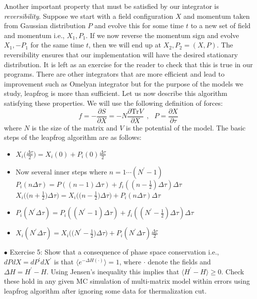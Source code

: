 \documentclass[letter,11pt]{article}
\begin{document}
Another important property that must be satisfied by our integrator is \emph{reversibility}. Suppose we start with a field configuration $X$ and momentum taken from Gaussian distribution $P$ and evolve this for some time $t$ to a new set of field and momentum i.e., $X_{1},P_{1}$. If we now reverse the momentum sign and evolve 
$X_{1},-P_{1} $ for the same time $t$, then we will end up at $X_{2},P_{2} = (X,P)$. The reversibility ensures that our implementation will have the desired stationary distribution. It is left as an exercise for the reader to check that this is true in our programs. There are other integrators that are more efficient and lead to improvement such as Omelyan integrator but for the purpose of the models we study, leapfrog is more than sufficient. Let us now describe this algorithm satisfying these properties. We will use the following definition of forces:
\begin{equation}
	f = -\frac{\partial S}{\partial X} = -N\frac{\partial \mbox{Tr} V}{\partial X} ~~,~~~ P = \frac{\partial X}{\partial \tau}
\end{equation} 
where $N$ is the size of the matrix and $V$ is the potential of the model. The basic steps of the leapfrog algorithm are as follows:
\vspace{7mm} 
\begin{center}
\begin{itemize}
	\item $X_{i}\big(\frac{\Delta \tau}{2}\big) = X_{i}(0) + P_{i}(0)\frac{\Delta \tau}{2}$
	\item Now several inner steps where $n =  1 \cdots (N^{\prime}-1)$
	\subitem $P_{i}(n \Delta \tau) = P((n-1) \Delta \tau) + f_{i}((n-\frac{1}{2}) \Delta \tau) \Delta \tau$ 
	\subitem $X_{i}\Big(\Big(n + \frac{1}{2}\Big) \Delta \tau\Big) = X_{i}\Big(\Big(n - \frac{1}{2}\Big) \Delta \tau\Big)  + P_{i}(n \Delta \tau) \Delta \tau$
	\item $P_{i}(N^{\prime} \Delta \tau) = P_{i}((N^{\prime}-1) \Delta \tau) + f_{i}((N^{\prime}-\frac{1}{2}) \Delta \tau) \Delta \tau$ 
	\item $X_{i}(N^{\prime} \Delta \tau) = X_{i}\Big(\Big(N^{\prime} - \frac{1}{2}\Big) \Delta \tau\Big) + P_{i}(N^{\prime} \Delta \tau) \frac{\Delta \tau}{2}$ 
\end{itemize} 
\end{center}
\vspace{7mm} 
    \begin{mdframed}[backgroundcolor=blue!3] 
    $\bullet$ Exercise 5: Show that a consequence of phase space conservation i.e., $dPdX = dP^{\prime}dX^{\prime}$ is that $ \langle e^{-\Delta H(\boldsymbol{\cdot})} \rangle = 1$, where $\boldsymbol{\cdot}$ denote the fields and $ \Delta H  = H^{\prime} - H $. Using Jensen's inequality this implies that $\langle H^{\prime} - H \rangle  \ge 0$. Check these hold in any given MC simulation of multi-matrix model within errors using leapfrog algorithm after ignoring some data for thermalization cut.
    \end{mdframed}
\end{document}
